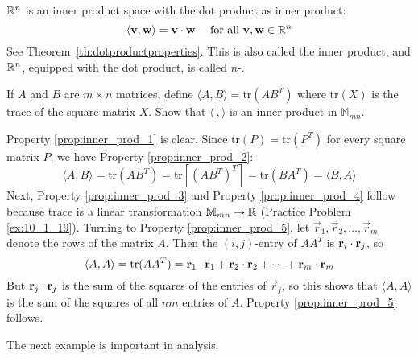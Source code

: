 \documentclass{ximera}
\begin{document}
\begin{example}\label{exa:030303}
$\mathbb{R}^n$ is an inner product space with the dot product as inner product:
\begin{equation*}
\langle \mathbf{v}, \mathbf{w} \rangle = \mathbf{v} \cdot \mathbf{w} \quad \mbox{ for all } \mathbf{v},  \mathbf{w} \in \mathbb{R}^n
\end{equation*}
See Theorem~\ref{th:dotproductproperties}. This is also called the
 inner product, and
$\mathbb{R}^n$, equipped with the dot product, is called 
$n$-.
\end{example}

\begin{example}\label{exa:030310}
If $A$ and $B$ are $m \times n$ matrices, define $\langle A, B\rangle = \mbox{tr}(AB^{T})$ where $\mbox{tr}(X)$ is the trace of the square matrix $X$. Show that $\langle\ , \rangle$ is an inner product in $\mathbb{M}_{mn}$.

\begin{explanation}
Property \ref{prop:inner_prod_1} is clear. Since $\mbox{tr}(P) = \mbox{tr}(P^{T})$ for every square matrix $P$, we have Property \ref{prop:inner_prod_2}:
\begin{equation*}
\langle A, B \rangle = \mbox{tr}(AB^T) = \mbox{tr}[(AB^T)^T] = \mbox{tr}(BA^T) = \langle B, A \rangle
\end{equation*}
Next, Property \ref{prop:inner_prod_3} and Property \ref{prop:inner_prod_4} follow because trace is a linear transformation $\mathbb{M}_{mn} \to \mathbb{R}$ (Practice Problem \ref{ex:10_1_19}). Turning to Property \ref{prop:inner_prod_5}, let $\vec{r}_{1}, \vec{r}_{2}, \dots, \vec{r}_{m}$ denote the rows of the matrix $A$. Then the $(i, j)$-entry of $AA^{T}$ is $\mathbf{r}_{i} \cdot \mathbf{r}_{j}$, so
\begin{equation*}
\langle A, A \rangle = \mbox{tr}(AA^T) =
\mathbf{r}_1 \cdot \mathbf{r}_1 +
\mathbf{r}_2 \cdot \mathbf{r}_2 + \dots +
\mathbf{r}_m \cdot \mathbf{r}_m
\end{equation*}
But $\mathbf{r}_{j} \cdot \mathbf{r}_{j}$ is the sum of the squares of
the entries of $\vec{r}_{j}$, so this shows that $\langle A, A\rangle$ is the sum of the squares of all $nm$ entries of $A$.  Property \ref{prop:inner_prod_5} follows.
\end{explanation}
\end{example}

The next example is important in analysis.
\end{document}
